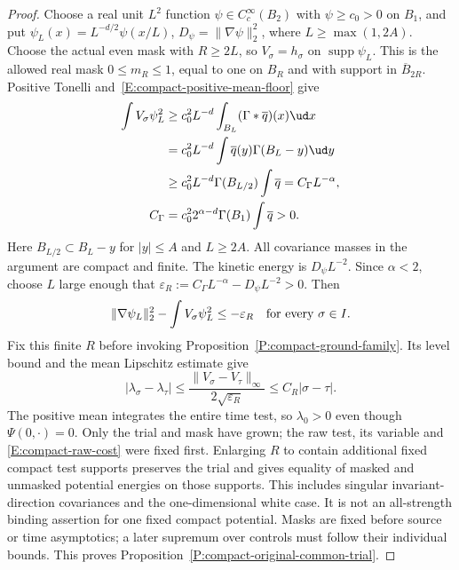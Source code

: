 \begin{proof}
  Choose a real unit $L^2$ function $\psi\in C_c^\infty(B_2)$
  with $\psi\ge c_0>0$ on $B_1$, and put
  $\psi_L(x)=L^{-d/2}\psi(x/L)$, $D_\psi=\|\nabla\psi\|_2^2$,
  where $L\ge\max(1,2A)$. Choose the actual even mask with
  $R\ge2L$, so $V_\sigma=h_\sigma$ on $\operatorname{supp}\psi_L$.
  This is the allowed real mask $0\le m_R\le1$, equal to one on $B_R$
  and with support in $\overline B_{2R}$.
  Positive Tonelli and~\eqref{E:compact-positive-mean-floor} give
  \begin{align}
    \int V_\sigma\psi_L^2
    &\ge c_0^2L^{-d}\int_{B_L}(\Gamma*\overline q)(x)\ud x\nonumber\\
    &=c_0^2L^{-d}\int\overline q(y)\Gamma(B_L-y)\ud y\nonumber\\
    &\ge c_0^2L^{-d}\Gamma(B_{L/2})\int\overline q
    =C_\Gamma L^{-\alpha},\label{E:compact-trial-potential}\\
    C_\Gamma&=c_0^22^{\alpha-d}\Gamma(B_1)\int\overline q>0.\nonumber
  \end{align}
  Here $B_{L/2}\subset B_L-y$ for $|y|\le A$ and $L\ge2A$.
  All covariance masses in the argument are compact and finite.
  The kinetic energy is $D_\psi L^{-2}$. Since $\alpha<2$,
  choose $L$ large enough that
  $\varepsilon_R:=C_\Gamma L^{-\alpha}-D_\psi L^{-2}>0$.
  Then
  \[
    \|\nabla\psi_L\|_2^2-\int V_\sigma\psi_L^2
    \le-\varepsilon_R\quad\hbox{for every }\sigma\in I.
  \]
  Fix this finite $R$ before invoking
  Proposition~\ref{P:compact-ground-family}.
  Its level bound and the mean Lipschitz estimate give
  \[
    |\lambda_\sigma-\lambda_\tau|
    \le\frac{\|V_\sigma-V_\tau\|_\infty}{2\sqrt{\varepsilon_R}}
    \le C_R|\sigma-\tau|.
  \]
  The positive mean integrates the entire time test, so
  $\lambda_0>0$ even though $\Psi(0,\cdot)=0$.
  Only the trial and mask have grown; the raw test, its variable and
  \eqref{E:compact-raw-cost} were fixed first.
  Enlarging $R$ to contain additional fixed compact test supports
  preserves the trial and gives equality of masked and unmasked
  potential energies on those supports. This includes singular
  invariant-direction covariances and the one-dimensional white case.
  It is not an all-strength binding assertion for one fixed compact
  potential. Masks are fixed before source or time asymptotics;
  a later supremum over controls must follow their individual bounds.
  This proves Proposition~\ref{P:compact-original-common-trial}.
\end{proof}
